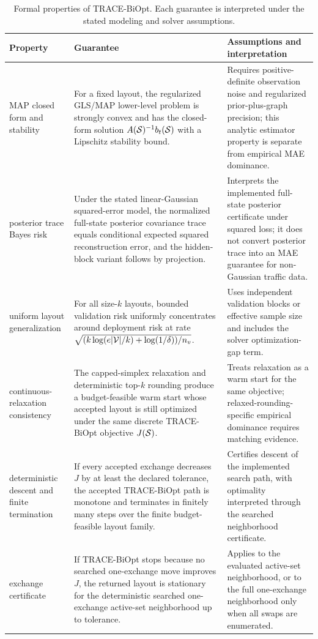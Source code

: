 \begin{table}[pos=htbp]
\centering
\caption{Formal properties of TRACE-BiOpt. Each guarantee is interpreted under the stated modeling and solver assumptions.}
\label{tab:theory}
\small
\begin{tabular}{>{\raggedright\arraybackslash}p{}>{\raggedright\arraybackslash}p{}>{\raggedright\arraybackslash}p{}}
\toprule
Property & Guarantee & Assumptions and interpretation \\
\midrule
MAP closed form and stability & For a fixed layout, the regularized GLS/MAP lower-level problem is strongly convex and has the closed-form solution $A(\mathcal{S})^{-1}b_t(\mathcal{S})$ with a Lipschitz stability bound. & Requires positive-definite observation noise and regularized prior-plus-graph precision; this analytic estimator property is separate from empirical MAE dominance. \\
posterior trace Bayes risk & Under the stated linear-Gaussian squared-error model, the normalized full-state posterior covariance trace equals conditional expected squared reconstruction error, and the hidden-block variant follows by projection. & Interprets the implemented full-state posterior certificate under squared loss; it does not convert posterior trace into an MAE guarantee for non-Gaussian traffic data. \\
uniform layout generalization & For all size-$k$ layouts, bounded validation risk uniformly concentrates around deployment risk at rate $\sqrt{(k\log(e|\mathcal{V}|/k)+\log(1/\delta))/n_v}$. & Uses independent validation blocks or effective sample size and includes the solver optimization-gap term. \\
continuous-relaxation consistency & The capped-simplex relaxation and deterministic top-$k$ rounding produce a budget-feasible warm start whose accepted layout is still optimized under the same discrete TRACE-BiOpt objective $J(\mathcal{S})$. & Treats relaxation as a warm start for the same objective; relaxed-rounding-specific empirical dominance requires matching evidence. \\
deterministic descent and finite termination & If every accepted exchange decreases $J$ by at least the declared tolerance, the accepted TRACE-BiOpt path is monotone and terminates in finitely many steps over the finite budget-feasible layout family. & Certifies descent of the implemented search path, with optimality interpreted through the searched neighborhood certificate. \\
exchange certificate & If TRACE-BiOpt stops because no searched one-exchange move improves $J$, the returned layout is stationary for the deterministic searched one-exchange active-set neighborhood up to tolerance. & Applies to the evaluated active-set neighborhood, or to the full one-exchange neighborhood only when all swaps are enumerated. \\

\end{tabular}
\end{table}
